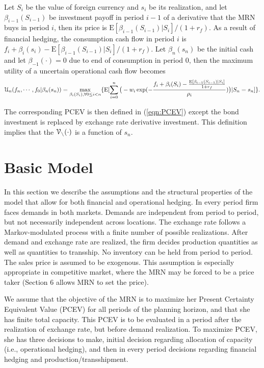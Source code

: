 \documentclass[mnsc,nonblindrev,copyedit]{informs2_wz} %
\newcommand{\E}{\mathrm{E}}
\newcommand{\V}{\cal{V}}
\begin{document}
Let $S_i$ be the value of foreign currency and $s_i$ be its realization, and let $\beta_{i-1}(S_{i-1})$ be investment payoff in period $i-1$ of a derivative that the MRN buys in period $i$, then its price is $\E[\beta_{i-1}(S_{i-1})|S_i]/(1+r_f)$. As a result of financial hedging, the consumption cash flow in period $i$ is $f_i + \beta_{i}(s_i) - \E[\beta_{i-1} (S_{i-1})|S_i]/(1+r_f)$. Let $\beta_{n}(s_n)$ be the initial cash  and let $\beta_{-1}(\cdot)=0$ due to end of consumption in period $0$, then the maximum utility of a uncertain operational cash flow becomes
\begin{eqnarray} 
    \label{eqn:maxU-FH}
\mathcal{U}_n(f_{n},\cdots,f_0|\beta _{n}(s_n) )  =\max_{\beta_{i}(S_{i}), \forall 0\leq i< n} \{\E [\sum_{i=0}^n \big{(}-w_{i}\exp(-\frac{f_{i} + \beta_{i}(S_i)-\frac{\E[\beta_{i-1}(S_{i-1})|S_i]}{1+r_f}}{\rho_i})\big{)}  |S_n=s_n]\}.
\end{eqnarray}

The corresponding PCEV is then defined in (\ref{eqn:PCEV}) except the bond investment is replaced by exchange rate derivative investment. This definition implies that the $\V_n(\cdot)$ is a function of $s_n$. 





\section{Basic Model \label{sect:basicModel}}

In this section we describe the assumptions and the structural properties of the model that allow for both financial and operational hedging.  In every period firm faces demands in both markets.  Demands are independent from period to period, but not necessarily independent across locations.  The exchange rate follows a Markov-modulated process with a finite number of possible realizations.  After demand and exchange rate are realized, the firm decides production quantities as well as quantities to transship.  No inventory can be held from period to period.  The sales price is assumed to be exogenous.  This assumption is especially appropriate in competitive market, where the MRN may be forced to be a price taker (Section 6 allows MRN to set the price). 

We assume that the objective of the MRN is to maximize her Present Certainty Equivalent Value (PCEV) for all periods of the planning horizon, and that she has finite total capacity. This PCEV is to be evaluated in a period after the realization of exchange rate, but before demand realization.  To maximize PCEV, she has three decisions to make, initial decision regarding allocation of capacity (i.e., operational hedging), and then in every period decisions regarding financial hedging and production/transshipment.
\end{document}
